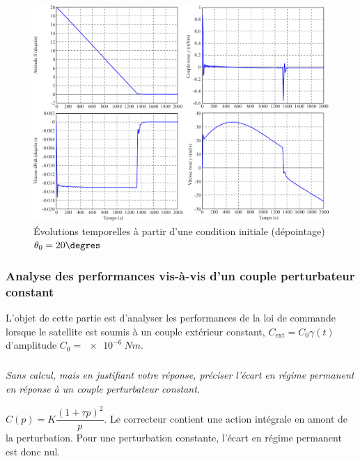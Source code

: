 \ifprof
\else

\begin{figure}[H]
\centering
\includegraphics[width=.8\linewidth]{images/fig_14}
\caption{Évolutions temporelles à partir d’une condition initiale (dépointage) $\theta_0 = 20\degres$ \label{fig_14}}
\end{figure}
\fi

\subsubsection{\label{sec:3:D:3} Analyse des performances vis-à-vis d’un couple perturbateur constant}

L’objet de cette partie est d’analyser les performances de la loi de commande lorsque le satellite est soumis à
un couple extérieur constant, $C_{\text{ext}}= C_0 \gamma(t)$ d’amplitude $C_0 =\SI{e-6}{Nm}$.

\subparagraph{\label{q_31}}\textit{Sans calcul, mais en justifiant votre réponse, préciser l’écart en régime permanent en réponse à un couple
perturbateur constant.}
\ifprof
\begin{corrige}
$C(p)=K\dfrac{\left(1+\tau p\right)^2}{p}$. Le correcteur contient une action intégrale en amont de la perturbation. Pour une perturbation constante, l'écart en régime permanent est donc nul.
\end{corrige}
\else
\fi

